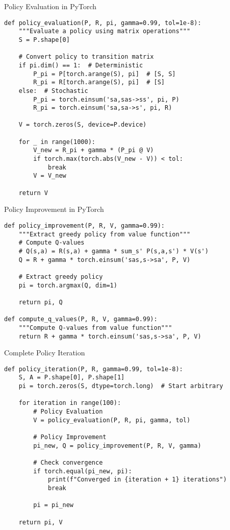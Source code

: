 \documentclass[aspectratio=169,10pt]{beamer}
\begin{document}
\begin{frame}[fragile]{Policy Evaluation in PyTorch}
\begin{lstlisting}
def policy_evaluation(P, R, pi, gamma=0.99, tol=1e-8):
    """Evaluate a policy using matrix operations"""
    S = P.shape[0]
    
    # Convert policy to transition matrix
    if pi.dim() == 1:  # Deterministic
        P_pi = P[torch.arange(S), pi]  # [S, S]
        R_pi = R[torch.arange(S), pi]  # [S]
    else:  # Stochastic
        P_pi = torch.einsum('sa,sas->ss', pi, P)
        R_pi = torch.einsum('sa,sa->s', pi, R)
    
    V = torch.zeros(S, device=P.device)
    
    for _ in range(1000):
        V_new = R_pi + gamma * (P_pi @ V)
        if torch.max(torch.abs(V_new - V)) < tol:
            break
        V = V_new
    
    return V
\end{lstlisting}
\end{frame}

\begin{frame}[fragile]{Policy Improvement in PyTorch}
\begin{lstlisting}
def policy_improvement(P, R, V, gamma=0.99):
    """Extract greedy policy from value function"""
    # Compute Q-values
    # Q(s,a) = R(s,a) + gamma * sum_s' P(s,a,s') * V(s')
    Q = R + gamma * torch.einsum('sas,s->sa', P, V)
    
    # Extract greedy policy
    pi = torch.argmax(Q, dim=1)
    
    return pi, Q

def compute_q_values(P, R, V, gamma=0.99):
    """Compute Q-values from value function"""
    return R + gamma * torch.einsum('sas,s->sa', P, V)
\end{lstlisting}
\end{frame}

\begin{frame}[fragile]{Complete Policy Iteration}
\begin{lstlisting}
def policy_iteration(P, R, gamma=0.99, tol=1e-8):
    S, A = P.shape[0], P.shape[1]
    pi = torch.zeros(S, dtype=torch.long)  # Start arbitrary
    
    for iteration in range(100):
        # Policy Evaluation
        V = policy_evaluation(P, R, pi, gamma, tol)
        
        # Policy Improvement
        pi_new, Q = policy_improvement(P, R, V, gamma)
        
        # Check convergence
        if torch.equal(pi_new, pi):
            print(f"Converged in {iteration + 1} iterations")
            break
        
        pi = pi_new
    
    return pi, V
\end{lstlisting}
\end{frame}
\end{document}
